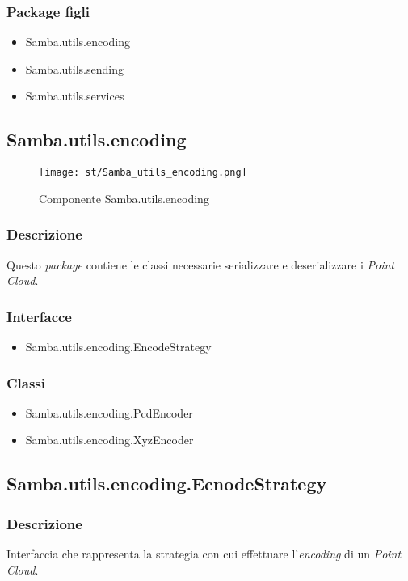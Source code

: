 \subsubsection{Package figli}
\begin{itemize}
	\item Samba.utils.encoding
	\item Samba.utils.sending
	\item Samba.utils.services
\end{itemize}


\subsection{Samba.utils.encoding}
\begin{figure}[!h] 
    \centering 
    \texttt{[image: st/Samba\_utils\_encoding.png]} 
    \caption{Componente Samba.utils.encoding}
\end{figure}
\subsubsection{Descrizione}
Questo \emph{package} contiene le classi necessarie serializzare e deserializzare i \emph{Point Cloud}.
\subsubsection{Interfacce}
\begin{itemize}
	\item Samba.utils.encoding.EncodeStrategy
\end{itemize}
\subsubsection{Classi}
\begin{itemize}
	\item Samba.utils.encoding.PcdEncoder
	\item Samba.utils.encoding.XyzEncoder
\end{itemize}

\subsection{Samba.utils.encoding.EcnodeStrategy}
\subsubsection{Descrizione}
Interfaccia che rappresenta la strategia con cui effettuare l'\emph{encoding} di un \emph{Point Cloud}.
